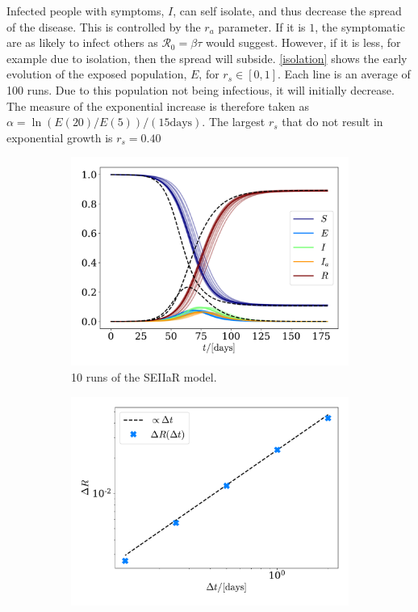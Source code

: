 \documentclass{article}
\begin{document}
    Infected people with symptoms, $I$, can self isolate, and thus decrease the spread of the disease.
    This is controlled by the $r_a$ parameter.
    If it is $1$, the symptomatic are as likely to infect others as $\mathcal{R}_0 = \beta \tau $ would suggest. 
    However, if it is less, for example due to isolation, then the spread will subside.
    \autoref{isolation} shows the early evolution of the exposed population, $E$, for $r_s\in [0, 1]$.
    Each line is an average of 100 runs.
    Due to this population not being infectious, it will initially decrease.
    The measure of the exponential increase is therefore taken as $\alpha = \ln\left(E(20)/E(5)\right)/(15 \mathrm{days})$.
    The largest $r_s$ that do not result in exponential growth is $r_s = 0.40$
    
    \begin{figure}[H]
        \centering
        \begin{subfigure}{.49\textwidth}
            \includegraphics[width=\textwidth]{../plots/2C/TestSEIIaR.pdf}
            \caption{10 runs of the SEIIaR model.}
            \label{SEIIaR}
        \end{subfigure}
        \begin{subfigure}{.49\textwidth}
            \includegraphics[width=\textwidth]{../plots/2C/conv.pdf}

\end{subfigure}
\end{figure}
\end{document}
